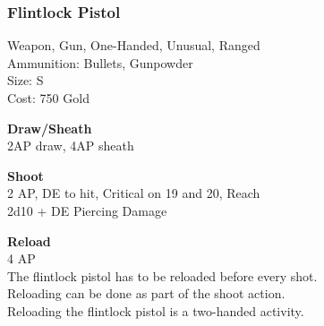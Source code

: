 \subsubsection{Flintlock Pistol}\label{weapon:flintlockPistol}
Weapon, Gun, One-Handed, Unusual, Ranged\\
Ammunition: Bullets, Gunpowder\\
Size: S\\
Cost: 750 Gold

\textbf{Draw/Sheath} \\
2AP draw, 4AP sheath

\textbf{Shoot} \\
2 AP, DE to hit, Critical on 19 and 20,  Reach\\
2d10 + DE Piercing Damage

\textbf{Reload} \\
4 AP\\
The flintlock pistol has to be reloaded before every shot.\\
Reloading can be done as part of the shoot action.\\
Reloading the flintlock pistol is a two-handed activity.
